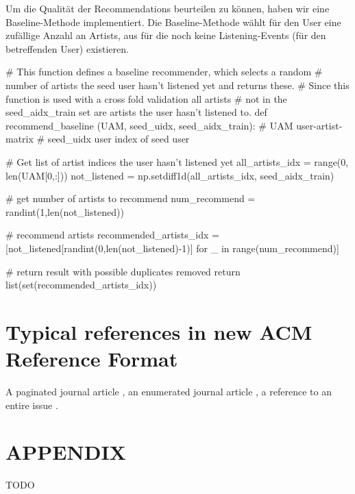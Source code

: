 \documentclass[prodmode,acmtecs]{acmsmall} %
\begin{document}
Um die Qualität der Recommendations beurteilen zu können, haben wir eine Baseline-Methode implementiert. Die Baseline-Methode wählt für den User eine zufällige Anzahl an Artists, aus für die noch keine Listening-Events (für den betreffenden User) existieren.

\begin{python}
# This function defines a baseline recommender, which selects a random 
# number of artists the seed user hasn't listened yet and returns these. 
# Since this function is used with a cross fold validation all artists 
# not in the seed_aidx_train set are artists the user hasn't listened to.
def recommend_baseline (UAM, seed_uidx, seed_aidx_train):
    # UAM               user-artist-matrix
    # seed_uidx         user index of seed user

    # Get list of artist indices the user hasn't listened yet
    all_artists_idx = range(0, len(UAM[0,:]))
    not_listened = np.setdiff1d(all_artists_idx, seed_aidx_train)

    # get number of artists to recommend
    num_recommend = randint(1,len(not_listened))

    # recommend artists
    recommended_artists_idx = [not_listened[randint(0,len(not_listened)-1)] for _ in range(num_recommend)]

    # return result with possible duplicates removed
    return list(set(recommended_artists_idx))
\end{python}



\section{Typical references in new ACM Reference Format}
A paginated journal article \cite{Abril07}, an enumerated
journal article \cite{Cohen07}, a reference to an entire issue \cite{JCohen96}.

\appendix
\section*{APPENDIX}
\setcounter{section}{1}
TODO





\medskip
\end{document}
